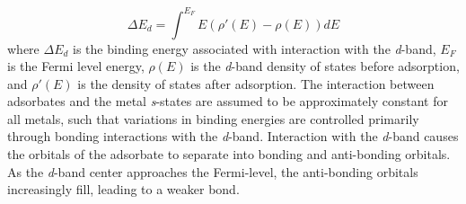 \begin{equation}
    \Delta E_d = \int^{E_F} E(\rho'(E) - \rho(E))dE
    \label{eq:d_band}
\end{equation}
where $\Delta E_d$ is the binding energy associated with interaction with the \textit{d}-band, $E_F$ is the Fermi level energy, $\rho(E)$ is the \textit{d}-band density of states before adsorption, and $\rho'(E)$ is the density of states after adsorption. The interaction between adsorbates and the metal \textit{s}-states are assumed to be approximately constant for all metals, such that variations in binding energies are controlled primarily through bonding interactions with the \textit{d}-band. Interaction with the \textit{d}-band causes the orbitals of the adsorbate to separate into bonding and anti-bonding orbitals. As the \textit{d}-band center approaches the Fermi-level, the anti-bonding orbitals increasingly fill, leading to a weaker bond.

